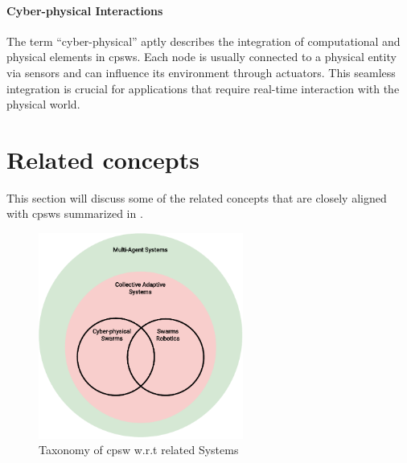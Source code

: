 \paragraph*{Cyber-physical Interactions}
The term ``cyber-physical'' aptly describes the integration of computational and physical elements in \acp{cpsw}. 
 Each node is usually connected to a physical entity via sensors and can influence its environment through actuators. 
 This seamless integration is crucial for applications that require real-time interaction with the physical world.

\section{Related concepts}
\begin{table}[h]
    \centering
    \caption{Summarized comparison between MAS, Swarm Robotics, CAS and \ac{cpsw}}
    \label{table:your_label}
\end{table}
This section will discuss some of the related concepts that are closely aligned with \acp{cpsw} summarized in .
\begin{figure}
    \centering
    \includegraphics[width=0.6\textwidth]{chapters/img/cyber-physical-swarms-taxonomy.drawio.pdf}
    \caption{Taxonomy of \acf{cpsw} w.r.t related Systems}\label{fig:overview-cpsw-taxonomy}
\end{figure}
